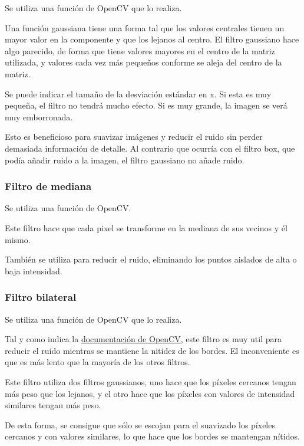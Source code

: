 \documentclass[12pt]{article}
\begin{document}
Se utiliza una función de OpenCV que lo realiza.

Una función gaussiana tiene una forma tal que los valores centrales tienen un mayor valor en la componente y que los lejanos al centro. El filtro gaussiano hace algo parecido, de forma que tiene valores mayores en el centro de la matriz utilizada, y valores cada vez más pequeños conforme se aleja del centro de la matriz.

Se puede indicar el tamaño de la desviación estándar en x. Si esta es muy pequeña, el filtro no tendrá mucho efecto. Si es muy grande, la imagen se verá muy emborronada.

Esto es beneficioso para suavizar imágenes y reducir el ruido sin perder demasiada información de detalle. Al contrario que ocurría con el filtro box, que podía añadir ruido a la imagen, el filtro gaussiano no añade ruido.

\subsubsection*{Filtro de mediana}

Se utiliza una función de OpenCV.

Este filtro hace que cada pixel se transforme en la mediana de sus vecinos y él mismo.

También se utiliza para reducir el ruido, eliminando los puntos aislados de alta o baja intensidad.

\subsubsection*{Filtro bilateral}

Se utiliza una función de OpenCV que lo realiza.

Tal y como indica la \href{https://docs.opencv.org/4.x/d4/d86/group__imgproc__filter.html#ga564869aa33e58769b4469101aac458f9}{documentación de OpenCV}, este filtro es muy util para reducir el ruido mientras se mantiene la nitidez de los bordes. El inconveniente es que es más lento que la mayoría de los otros filtros.

Este filtro utiliza dos filtros gaussianos, uno hace que los píxeles cercanos tengan más peso que los lejanos, y el otro hace que los píxeles con valores de intensidad similares tengan más peso. 

De esta forma, se consigue que sólo se escojan para el suavizado los píxeles cercanos y con valores similares, lo que hace que los bordes se mantengan nítidos.
\end{document}
